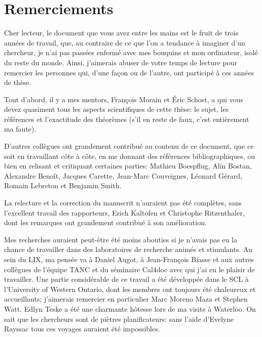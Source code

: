 


\chapter*{Remerciements}

Cher lecteur, le document que vous avez entre les mains est le fruit
de trois années de travail, que, au contraire de ce que l'on a
tendance à imaginer d'un chercheur, je n'ai pas passées enfermé avec
mes bouquins et mon ordinateur, isolé du reste du monde. Ainsi,
j'aimerais abuser de votre temps de lecture pour remercier les
personnes qui, d'une façon ou de l'autre, ont participé à ces années
de thèse.

Tout d'abord, il y a mes mentors, François Morain et Éric Schost, a
qui vous devez quasiment tous les aspects scientifiques de cette
thèse: le sujet, les références et l'exactitude des théorèmes (s'il en
reste de faux, c'est entièrement ma faute).

D'autres collègues ont grandement contribué au contenu de ce document,
que ce soit en travaillant côte à côte, en me donnant des références
bibliographiques, ou bien en relisant et critiquant certaines parties:
Mathieu Boespflug, Alin Bostan, Alexandre Benoît, Jacques Carette,
Jean-Marc Couveignes, Léonard Gérard, Romain Lebreton et Benjamin
Smith.

La relecture et la correction du manuscrit n'auraient pas été
complètes, sans l'excellent travail des rapporteurs, Erich Kaltofen et
Christophe Ritzenthaler, dont les remarques ont grandement contribué à
son amélioration. 

Mes recherches auraient peut-être été moins abouties si je n'avais pas
eu la chance de travailler dans des laboratoires de recherche animés
et stimulants. Au sein du LIX, ma pensée va à Daniel Augot, à
Jean-François Biasse et aux autres collègues de l'équipe TANC et du
séminaire Cal4doc avec qui j'ai eu le plaisir de travailler.  Une
partie considérable de ce travail a été développée dans le SCL à
l'University of Western Ontario, dont les membres ont toujours été
chaleureux et accueillants; j'aimerais remercier en particulier Marc
Moreno Maza et Stephen Watt. Edlyn Teske a été une charmante hôtesse
lors de ma visite à Waterloo.  On sait que les chercheurs sont de
piètres planificateurs: sans l'aide d'Evelyne Rayssac tous ces voyages
auraient été impossibles.

